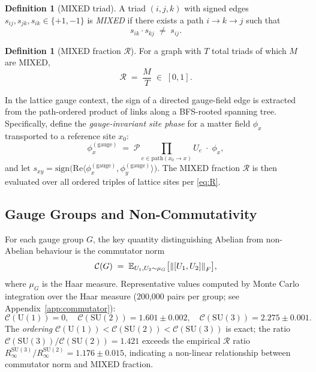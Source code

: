 \documentclass[12pt,a4paper]{article}
\newcommand{\R}{\mathcal{R}}           %
\newcommand{\SU}[1]{\mathrm{SU}(#1)}
\newcommand{\UN}[1]{\mathrm{U}(#1)}
\theoremstyle{plain}
\theoremstyle{definition}
\newtheorem{definition}[theorem]{Definition}
\theoremstyle{remark}
\begin{document}
\begin{definition}[MIXED triad]
\label{def:mixed}
A triad $(i,j,k)$ with signed edges $s_{ij},s_{jk},s_{ik}\in\{+1,-1\}$ is \emph{MIXED}
if there exists a path $i\to k \to j$ such that
\begin{equation}
  s_{ik}\cdot s_{kj} \;\neq\; s_{ij}.
  \label{eq:mixed}
\end{equation}
\end{definition}

\begin{definition}[MIXED fraction $\R$]
For a graph with $T$ total triads of which $M$ are MIXED,
\begin{equation}
  \R \;=\; \frac{M}{T} \;\in\; [0,1].
  \label{eq:R}
\end{equation}
\end{definition}

In the lattice gauge context, the sign of a directed gauge-field edge is extracted from
the path-ordered product of links along a BFS-rooted spanning tree.
Specifically, define the \emph{gauge-invariant site phase} for a matter field
$\phi_x$ transported to a reference site $x_0$:
\begin{equation}
  \phi_x^{(\text{gauge})} \;=\; \mathcal{P}\!\!\prod_{e\in\mathrm{path}(x_0\to x)} U_e\;\cdot\;\phi_x,
\end{equation}
and let $s_{xy}=\mathrm{sign}\bigl(\mathrm{Re}\langle\phi_x^{(\text{gauge})},\phi_y^{(\text{gauge})}\rangle\bigr)$.
The MIXED fraction $\R$ is then evaluated over all ordered triples of lattice sites per
\cref{eq:R}.

\subsection{Gauge Groups and Non-Commutativity}

For each gauge group $G$, the key quantity distinguishing Abelian from non-Abelian
behaviour is the commutator norm
\begin{equation}
  \mathcal{C}(G) \;=\; \mathbb{E}_{U_1,U_2\sim\mu_G}\bigl[\norm{\comm{U_1}{U_2}}_F\bigr],
\end{equation}
where $\mu_G$ is the Haar measure.
Representative values computed by Monte Carlo integration over the Haar measure
(200{,}000 pairs per group; see Appendix~\ref{app:commutator}):
\begin{equation}
  \mathcal{C}(\UN{1})=0, \quad \mathcal{C}(\SU{2})=1.601\pm0.002, \quad
  \mathcal{C}(\SU{3})=2.275\pm0.001.
\end{equation}
The \emph{ordering} $\mathcal{C}(\UN{1})<\mathcal{C}(\SU{2})<\mathcal{C}(\SU{3})$ is
exact; the ratio $\mathcal{C}(\SU{3})/\mathcal{C}(\SU{2})=1.421$ exceeds the
empirical $\R$ ratio $R_\infty^{\SU{3}}/R_\infty^{\SU{2}}=1.176\pm0.015$,
indicating a non-linear relationship between commutator norm and MIXED fraction.
\end{document}
